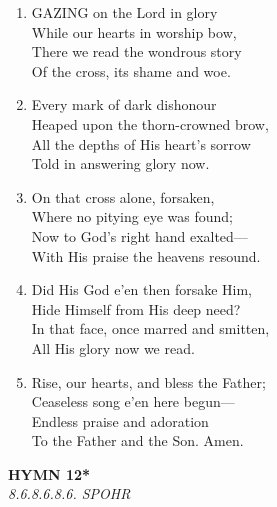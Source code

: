 \begin{enumerate}
    \item GAZING on the Lord in glory \\
        While our hearts in worship bow, \\
        There we read the wondrous story \\
        Of the cross, its shame and woe.

    \item Every mark of dark dishonour \\
        Heaped upon the thorn-crowned brow, \\
        All the depths of His heart's sorrow \\
        Told in answering glory now.

    \item On that cross alone, forsaken, \\
        Where no pitying eye was found; \\
        Now to God's right hand exalted--- \\
        With His praise the heavens resound.

    \item Did His God e'en then forsake Him, \\
        Hide Himself from His deep need? \\
        In that face, once marred and smitten, \\
        All His glory now we read.

    \item Rise, our hearts, and bless the Father; \\
        Ceaseless song e'en here begun--- \\
        Endless praise and adoration \\
        To the Father and the Son. Amen.

\end{enumerate}

\newpage
\begin{center}
    {\Large \textbf{HYMN 12*}}
    \\
    \textit{8.6.8.6.8.6. SPOHR}
\end{center}
\vspace{1em}


